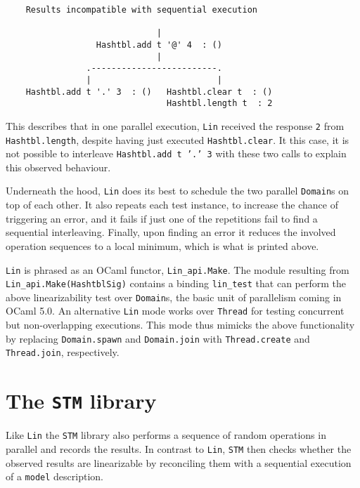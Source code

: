 \documentclass[twocolumn,10pt]{article}
\begin{document}
\begingroup{}
\begin{lstlisting}
    Results incompatible with sequential execution
    
                              |
                  Hashtbl.add t '@' 4  : ()
                              |
                .-------------------------.
                |                         |
    Hashtbl.add t '.' 3  : ()   Hashtbl.clear t  : ()
                                Hashtbl.length t  : 2
\end{lstlisting}
\endgroup

This describes that in one parallel execution, \texttt{Lin} received the
response \texttt{2} from \texttt{Hashtbl.length}, despite having just executed
\texttt{Hashtbl.clear}.  It this case, it is not possible to interleave
\texttt{Hashtbl.add t '.' 3} with these two calls to explain this observed
behaviour.

Underneath the hood, \texttt{Lin} does its best to schedule the two parallel
\texttt{Domain}s on top of each other. It also repeats each test instance, to
increase the chance of triggering an error, and it fails if just one
of the repetitions fail to find a sequential interleaving. Finally,
upon finding an error it reduces the involved operation sequences to a
local minimum, which is what is printed above.

\texttt{Lin} is phrased as an OCaml functor, \lstinline|Lin_api.Make|. The module
resulting from \lstinline|Lin_api.Make(HashtblSig)| contains a binding \lstinline|lin_test|
that can perform the above linearizability test over \texttt{Domain}s, the
basic unit of parallelism coming in OCaml 5.0. An alternative \texttt{Lin}
mode works over \texttt{Thread} for testing concurrent but non-overlapping
executions. This mode thus mimicks the above functionality by
replacing \texttt{Domain.spawn} and \texttt{Domain.join} with \texttt{Thread.create} and
\texttt{Thread.join}, respectively.


\section{The \texttt{STM} library}

Like \texttt{Lin} the \texttt{STM} library also performs a sequence of random
operations in parallel and records the results. In contrast to \texttt{Lin},
\texttt{STM} then checks whether the observed results are linearizable by
reconciling them with a sequential execution of a \texttt{model} description.
\end{document}
